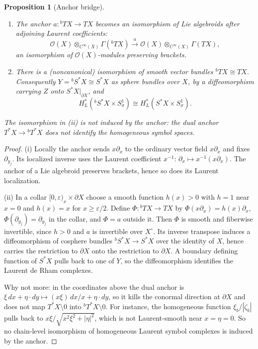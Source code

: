 \documentclass[11pt,oneside,reqno]{article}
\newcommand{\cO}{\mathcal O}
\newcommand{\Sbstar}{{}^{b}S^*X}
\newcommand{\Tbstar}{{}^{b}T^*X}
\theoremstyle{plain}
\newtheorem{proposition}[theorem]{Proposition}
\theoremstyle{definition}
\theoremstyle{remark}
\begin{document}
\begin{proposition}[Anchor bridge]\label{prop:anchor}
\begin{enumerate}
\item[(i)] The anchor \(a:{}^bTX\to TX\) becomes an isomorphism of Lie
algebroids after adjoining Laurent coefficients:
\[
 \cO(X)\otimes_{C^\infty(X)}\Gamma({}^bTX)
 \xrightarrow{\;a\;}
 \cO(X)\otimes_{C^\infty(X)}\Gamma(TX),
\]
an isomorphism of \(\cO(X)\)-modules preserving brackets.
\item[(ii)] There is a (noncanonical) isomorphism of smooth vector bundles
\({}^bTX\cong TX\). Consequently \(Y=\Sbstar\cong S^*X\) as sphere
bundles over \(X\), by a diffeomorphism carrying \(Z\) onto
\(S^*X|_{\partial X}\), and
\[
 H_L^*(\Sbstar\times S^1_\sigma)
 \cong H_L^*(S^*X\times S^1_\sigma).
\]
\end{enumerate}
The isomorphism in (ii) is not induced by the anchor: the dual anchor
\(T^*X\to\Tbstar\) does not identify the homogeneous symbol spaces.
\end{proposition}

\begin{proof}
(i) Locally the anchor sends \(x\partial_x\) to the ordinary vector field
\(x\partial_x\) and fixes \(\partial_{y_j}\). Its localized inverse uses
the Laurent coefficient \(x^{-1}\):
\(\partial_x\mapsto x^{-1}(x\partial_x)\). The anchor of a Lie algebroid
preserves brackets, hence so does its Laurent localization.

(ii) In a collar \([0,\varepsilon)_x\times\partial X\) choose a smooth
function \(h(x)>0\) with \(h=1\) near \(x=0\) and \(h(x)=x\) for
\(x\geq\varepsilon/2\). Define \(\Phi:{}^bTX\to TX\) by
\(\Phi(x\partial_x)=h(x)\partial_x\), \(\Phi(\partial_{y_j})=\partial_{y_j}\)
in the collar, and \(\Phi=a\) outside it. Then \(\Phi\) is smooth and
fiberwise invertible, since \(h>0\) and \(a\) is invertible over
\(X^\circ\). Its inverse transpose induces a diffeomorphism of cosphere
bundles \(\Sbstar\to S^*X\) over the identity of \(X\), hence carries the
restriction to \(\partial X\) onto the restriction to \(\partial X\).
A boundary defining function of \(S^*X\) pulls back to one of \(Y\), so
the diffeomorphism identifies the Laurent de Rham complexes.

Why not more: in the coordinates above the dual anchor is
\(\xi\,dx+\eta\cdot dy\mapsto (x\xi)\,dx/x+\eta\cdot dy\), so it kills the
conormal direction at \(\partial X\) and does not map \(T^*X\setminus0\)
into \(\Tbstar\setminus0\). For instance, the homogeneous function
\(\xi_b/|\zeta_b|\) pulls back to \(x\xi/\sqrt{x^2\xi^2+|\eta|^2}\), which
is not Laurent-smooth near \(x=\eta=0\). So no chain-level isomorphism of
homogeneous Laurent symbol complexes is induced by the anchor.
\end{proof}
\end{document}
